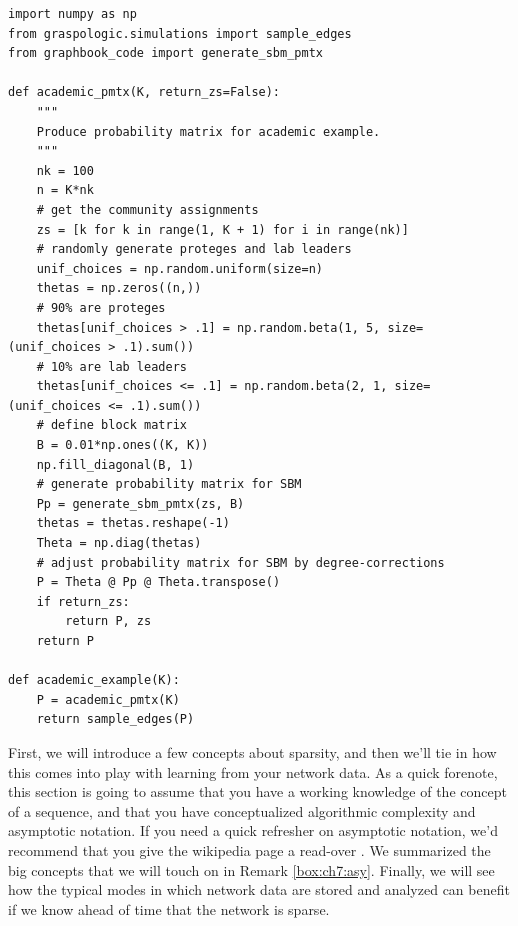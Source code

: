\begin{lstlisting}[style=python]
import numpy as np
from graspologic.simulations import sample_edges
from graphbook_code import generate_sbm_pmtx
    
def academic_pmtx(K, return_zs=False):
    """
    Produce probability matrix for academic example.
    """
    nk = 100
    n = K*nk
    # get the community assignments
    zs = [k for k in range(1, K + 1) for i in range(nk)]
    # randomly generate proteges and lab leaders
    unif_choices = np.random.uniform(size=n)
    thetas = np.zeros((n,))
    # 90% are proteges
    thetas[unif_choices > .1] = np.random.beta(1, 5, size=(unif_choices > .1).sum())
    # 10% are lab leaders
    thetas[unif_choices <= .1] = np.random.beta(2, 1, size=(unif_choices <= .1).sum())
    # define block matrix
    B = 0.01*np.ones((K, K))
    np.fill_diagonal(B, 1)
    # generate probability matrix for SBM
    Pp = generate_sbm_pmtx(zs, B)
    thetas = thetas.reshape(-1)
    Theta = np.diag(thetas)
    # adjust probability matrix for SBM by degree-corrections
    P = Theta @ Pp @ Theta.transpose()
    if return_zs:
        return P, zs
    return P

def academic_example(K):
    P = academic_pmtx(K)
    return sample_edges(P)
\end{lstlisting}

First, we will introduce a few concepts about sparsity, and then we’ll tie in how this comes into play with learning from your network data. As a quick forenote, this section is going to assume that you have a working knowledge of the concept of a sequence, and that you have conceptualized algorithmic complexity and asymptotic notation. If you need a quick refresher on asymptotic notation, we'd recommend that you give the wikipedia page a read-over \cite{bigonotation}. We summarized the big concepts that we will touch on in Remark \ref{box:ch7:asy}. Finally, we will see how the typical modes in which network data are stored and analyzed can benefit if we know ahead of time that the network is sparse.


